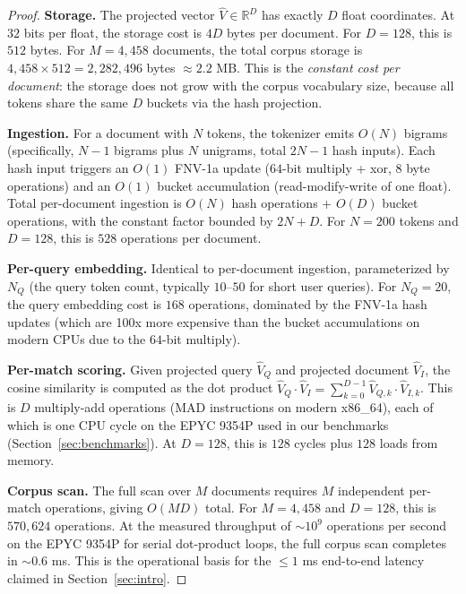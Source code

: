 \documentclass[10pt,twocolumn]{article}
\theoremstyle{definition}
\theoremstyle{remark}
\begin{document}
\begin{proof}
\textbf{Storage.} The projected vector $\hat{V} \in \mathbb{R}^D$ has
exactly $D$ float coordinates. At $32$ bits per float, the storage cost
is $4D$ bytes per document. For $D = 128$, this is $512$ bytes. For
$M = 4{,}458$ documents, the total corpus storage is $4{,}458 \times
512 = 2{,}282{,}496$ bytes $\approx 2.2$ MB. This is the
\emph{constant cost per document}: the storage does not grow with the
corpus vocabulary size, because all tokens share the same $D$
buckets via the hash projection.

\textbf{Ingestion.} For a document with $N$ tokens, the tokenizer emits
$O(N)$ bigrams (specifically, $N - 1$ bigrams plus $N$ unigrams, total
$2N - 1$ hash inputs). Each hash input triggers an $O(1)$ FNV-1a
update ($64$-bit multiply + xor, $8$ byte operations) and an $O(1)$
bucket accumulation (read-modify-write of one float). Total per-document
ingestion is $O(N)$ hash operations + $O(D)$ bucket operations, with
the constant factor bounded by $2N + D$. For $N = 200$ tokens and
$D = 128$, this is $528$ operations per document.

\textbf{Per-query embedding.} Identical to per-document ingestion,
parameterized by $N_Q$ (the query token count, typically $10$--$50$ for
short user queries). For $N_Q = 20$, the query embedding cost is $168$
operations, dominated by the FNV-1a hash updates (which are 100x more
expensive than the bucket accumulations on modern CPUs due to the
$64$-bit multiply).

\textbf{Per-match scoring.} Given projected query $\hat{V}_Q$ and
projected document $\hat{V}_I$, the cosine similarity is computed as
the dot product $\hat{V}_Q \cdot \hat{V}_I = \sum_{k=0}^{D-1}
\hat{V}_{Q,k} \cdot \hat{V}_{I,k}$. This is $D$ multiply-add operations
(MAD instructions on modern x86\_64), each of which is one CPU cycle
on the EPYC 9354P used in our benchmarks (Section~\ref{sec:benchmarks}).
At $D = 128$, this is $128$ cycles plus $128$ loads from memory.

\textbf{Corpus scan.} The full scan over $M$ documents requires $M$
independent per-match operations, giving $O(MD)$ total. For $M =
4{,}458$ and $D = 128$, this is $570{,}624$ operations. At the measured
throughput of $\sim 10^9$ operations per second on the EPYC 9354P for
serial dot-product loops, the full corpus scan completes in $\sim 0.6$
ms. This is the operational basis for the $\le 1$ ms end-to-end
latency claimed in Section~\ref{sec:intro}. \qedhere
\end{proof}
\end{document}
